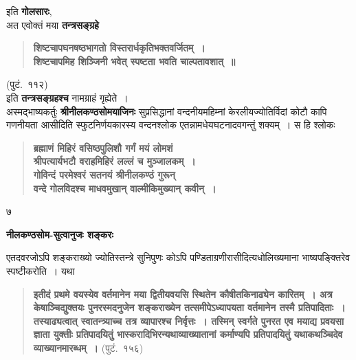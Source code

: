 \documentclass[11pt, openany]{book}
\begin{document}
इति \textbf{गोलसारः},\\

अत एवोक्तं मया \textbf{तन्त्रसङ्ग्रहे}\textendash 

\begin{quote}
\textbf{शिष्टचापघनषष्ठभागतो विस्तरार्धकृतिभक्तवर्जितम्~।\\
शिष्टचापमिह शिञ्जिनी भवेत् स्पष्टता भवति चाल्पतावशात्~॥} 
\end{quote}
\vspace{-2mm}
\hspace{9.5cm}(पुटं.~११२)\\

इति \textbf{तन्त्रसङ्ग्रहश्च} नामग्राहं गृह्येते~। \\

अस्मद्भाष्यकर्तुः \textbf{श्रीनीलकण्ठसोमयाजिनः} सुप्रसिद्धानां वन्दनीयमहिम्नां केरलीयज्योतिर्विदां कोटौ कापि गणनीयता आसीदिति स्फुटनिर्णयकारस्य वन्दनश्लोक एतन्नामधेयघटनादवगन्तुं शक्यम्~। स हि श्लोकः\textendash 

\begin{quote}
\textbf{ब्रह्माणं मिहिरं वसिष्ठपुलिशौ गर्गं मयं लोमशं\\
श्रीपत्यार्यभटौ वराहमिहिरं लल्लं च मुञ्जालकम्~।\\
गोविन्दं परमेश्वरं सतनयं श्रीनीलकण्ठं गुरून् \\
वन्दे गोलविदश्च माधवमुखान् वाल्मीकिमुख्यान् कवीन्~।}
\end{quote}

\newpage

\begin{center}
	७ 
\end{center}
\thispagestyle{empty}
\begin{minipage}[t]{0.15\textwidth}
\textbf{नीलकण्ठसोम-सुत्वानुजः शङ्करः}
\end{minipage} 
\begin{minipage}[t]{0.55\textwidth} 
एतदवरजोऽपि शङ्कराख्यो ज्योतिस्तन्त्रे सुनिपुणः कोऽपि पण्डिताग्रणीरासीदित्यधोलिख्यमाना भाष्यपङ्क्तिरेव
स्पष्टीकरोति~। यथा\textendash 
\end{minipage}
 
\begin{quote} 
\textbf{इतीदं प्रथमे वयस्येव वर्तमानेन मया द्वितीयवयसि स्थितेन कौषीतकिनाढ्येन कारितम्~। अत्र केषाञ्चिद्युक्तयः पुनरस्मदनुजेन शङ्कराख्येन तत्समीपेऽध्यापयता वर्तमानेन तस्मै प्रतिपादिताः~। तस्याढ्यत्वात् स्वातन्त्र्याच्च तत्र व्यापारश्च निर्वृत्तः~। तस्मिन् स्वर्गते पुनरत एव मयाद्य प्रवयसा ज्ञाता युक्तीः प्रतिपादयितुं भास्करादिभिरन्यथाव्याख्यातानां कर्माण्यपि प्रतिपादयितुं यथाकथञ्चिदेव व्याख्यानमारब्धम्~।}
(पुटं.~१५६) 
\end{quote}
\end{document}
